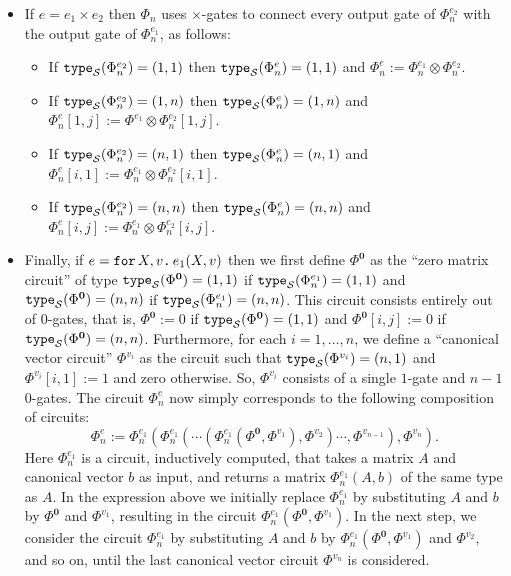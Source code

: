 \begin{itemize}
\begin{itemize}
\end{itemize}
\item If $e=e_1\times e_2$ then $\Phi_n$ uses $\times$-gates to connect every output gate of $\Phi_n^{e_2}$ with the output gate of $\Phi_n^{e_1}$, as follows:
\begin{itemize}
	\item If $\texttt{type}_{\mathcal{S}}(\Phi^{e_2}_n)=(1, 1)$  then $\texttt{type}_{\mathcal{S}}(\Phi^{e}_n)=(1, 1)$ and $\Phi^e_n:=\Phi^{e_1}_n \otimes \Phi^{e_2}_n$.
  \item If $\texttt{type}_{\mathcal{S}}(\Phi^{e_2}_n)=(1, n)$  then $\texttt{type}_{\mathcal{S}}(\Phi^{e}_n)=(1, n)$ and $\Phi^e_n[1,j]:=\Phi^{e_1} \otimes \Phi^{e_2}_n[1,j]$.
  \item If $\texttt{type}_{\mathcal{S}}(\Phi^{e_2}_n)=(n, 1)$  then $\texttt{type}_{\mathcal{S}}(\Phi^{e}_n)=(n, 1)$ and $\Phi^e_n[i,1]:=\Phi^{e_1}_n \otimes \Phi^{e_2}_n[i,1]$.
  \item If $\texttt{type}_{\mathcal{S}}(\Phi^{e_2}_n)=(n, n)$  then $\texttt{type}_{\mathcal{S}}(\Phi^{e}_n)=(n, n)$ and $\Phi^e_n[i,j]:=\Phi^{e_1}_n \otimes \Phi^{e_2}_n[i,j]$.
\end{itemize}

\item Finally, if $e=\texttt{for}\, X,v \texttt{.}\, e_1(X, v)$ then  we first  define $\Phi^{\mathbf{0}}$ 
as the ``zero matrix circuit'' of type  $\texttt{type}_{\mathcal{S}}(\Phi^{\mathbf{0}})=(1,1)$ if $\texttt{type}_{\mathcal{S}}(\Phi^{e_1}_n)=(1,1)$ and 
$\texttt{type}_{\mathcal{S}}(\Phi^{\mathbf{0}})=(n,n)$ if $\texttt{type}_{\mathcal{S}}(\Phi^{e_1}_n)=(n,n)$.  This circuit consists entirely out of $0$-gates,
that is, $\Phi^{\mathbf{0}}:=0$ if $\texttt{type}_{\mathcal{S}}(\Phi^{\mathbf{0}})=(1,1)$ and
$\Phi^{\mathbf{0}}[i,j]:=0$ if $\texttt{type}_{\mathcal{S}}(\Phi^{\mathbf{0}})=(n,n)$.
Furthermore, for each $i=1,\ldots, n$, we define a ``canonical vector circuit'' $\Phi^{v_i}$ as the circuit such that $\texttt{type}_{\mathcal{S}}(\Phi^{v_i})=(n,1)$ and $\Phi^{v_i}[i,1]:=1$ and zero otherwise. So, $\Phi^{v_i}$ consists of a single $1$-gate and $n-1$ $0$-gates.
The circuit $\Phi_n^e$ now simply corresponds to the following composition of circuits:
$$\Phi^{e}_n:=\Phi^{e_1}_n\left( \Phi^{e_1}_n \left( \cdots \left( \Phi^{e_1}_n\left( \Phi^{\mathbf{0}}, \Phi^{v_1}\right), \Phi^{v_2}\right)\cdots, \Phi^{v_{n-1}} \right), \Phi^{v_n} \right).$$
Here $\Phi_n^{e_1}$ is a circuit, inductively computed, that takes a matrix $A$ and canonical vector $b$ as input, and returns a matrix $\Phi_n^{e_1}(A,b)$ of the same type as $A$. In the expression above we initially replace $\Phi_n^{e_1}$ by substituting $A$ and $b$ by $\Phi^{\mathbf{0}}$ and $\Phi^{v_1}$, resulting in the circuit 
$\Phi_n^{e_1}(\Phi^{\mathbf{0}},\Phi^{v_1})$. In the next step, we consider the circuit $\Phi_n^{e_1}$ by substituting $A$ and $b$ by $\Phi_n^{e_1}(\Phi^{\mathbf{0}},\Phi^{v_1})$ and 
$\Phi^{v_2}$, and so on, until the last canonical vector circuit $\Phi^{v_n}$ is considered.
\end{itemize}

